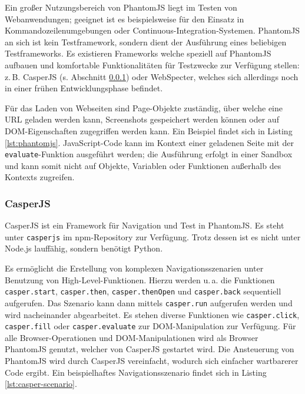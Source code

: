 Ein großer Nutzungsbereich von PhantomJS liegt im Testen von Webanwendungen; geeignet ist es beispielsweise für den Einsatz in Kommandozeilenumgebungen oder Continuous-Integration-Systemen. PhantomJS an sich ist kein Testframework, sondern dient der Ausführung eines beliebigen Testframeworks. Es existieren Frameworks welche speziell auf PhantomJS aufbauen und komfortable Funktionalitäten für Testzwecke zur Verfügung stellen: z.\,B. CasperJS (s. Abschnitt \ref{sec:CasperJS}) oder WebSpecter, welches sich allerdings noch in einer frühen Entwicklungsphase befindet.\cite{phantomjs-testing}

Für das Laden von Webseiten sind Page-Objekte zuständig, über welche eine URL geladen werden kann, Screenshots gespeichert werden können oder auf DOM-Eigenschaften zugegriffen werden kann. Ein Beispiel findet sich in Listing \ref{lst:phantomjs}. JavaScript-Code kann im Kontext einer geladenen Seite mit der \texttt{evaluate}-Funktion ausgeführt werden; die Ausführung erfolgt in einer Sandbox und kann somit nicht auf Objekte, Variablen oder Funktionen außerhalb des Kontexts zugreifen.\cite{phantomjs-quickstart}

\begin{figure}[H]
	
\end{figure}

\subsubsection{CasperJS}
\label{sec:CasperJS}
CasperJS ist ein Framework für Navigation und Test in PhantomJS. Es steht unter \texttt{casperjs} im npm-Repository zur Verfügung.\cite{casperjs-index} Trotz dessen ist es nicht unter Node.js lauffähig\cite{casperjs-faq}, sondern benötigt Python\cite{casperjs-installation}.

Es ermöglicht die Erstellung von komplexen Navigationsszenarien unter Benutzung von High-Level-Funktionen. Hierzu werden u.\,a. die Funktionen \texttt{casper.start}, \texttt{casper.then}, \texttt{casper.thenOpen} und \texttt{casper.back} sequentiell aufgerufen. Das Szenario kann dann mittels \texttt{casper.run} aufgerufen werden und wird nacheinander abgearbeitet. Es stehen diverse Funktionen wie \texttt{casper.click}, \texttt{casper.fill} oder \texttt{casper.evaluate} zur DOM-Manipulation zur Verfügung. Für alle Browser-Operationen und DOM-Manipulationen wird als Browser PhantomJS genutzt, welcher von CasperJS gestartet wird. Die Ansteuerung von PhantomJS wird durch CasperJS vereinfacht, wodurch sich einfacher wartbarerer Code ergibt\cite{casperjs-better-phantomjs}. Ein beispielhaftes Navigationsszenario findet sich in Listing \ref{lst:casper-scenario}.\cite{casperjs-index}

